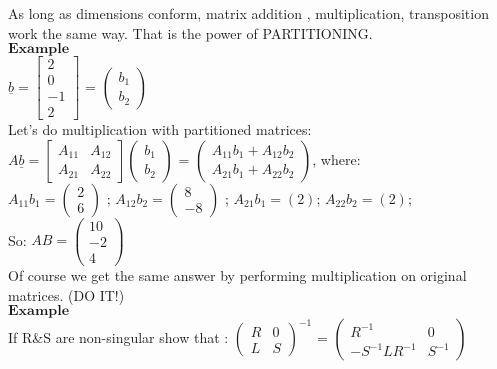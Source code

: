 \documentclass[]{article}
\begin{document}
As long as dimensions conform, matrix addition , multiplication,
transposition work the same way. That is the power of PARTITIONING.\\

\(\mathbf{Example}\)\\

\(\underline{b}=\left[\begin{array}{c|c} 2 \\ 0 \\ \hline -1 \\ 2 \end{array}\right]\)
= \(\begin{pmatrix} b_1 \\ b_2\end{pmatrix}\)\\

Let's do multiplication with partitioned matrices:\\

\(A\underline{b}=\left[\begin{array}{c|c}A_{11} & A_{12} \\ \hline A_{21} & A_{22} \end{array} \right]\begin{pmatrix} b_1 \\ b_2\end{pmatrix}\)
=
\(\begin{pmatrix} A_{11}b_1 + A_{12}b_2\\ A_{21}b_1 + A_{22}b_2\end{pmatrix}\),
where:\\

\(A_{11}b_1=\begin{pmatrix} 2 \\ 6\end{pmatrix}\) ;
\(A_{12}b_2=\begin{pmatrix} 8 \\ -8\end{pmatrix}\) ; \(A_{21}b_1=(2)\);
\(A_{22}b_2=(2)\);\\
 So: \(AB = \begin{pmatrix} 10 \\ -2 \\ 4\end{pmatrix}\)\\
 Of course we get the same answer by performing multiplication on
original matrices. (DO IT!)\\

\(\mathbf{Example}\)\\
 If R\&S are non-singular show that :
\(\begin{pmatrix} R & 0 \\ L & S\end{pmatrix}^{-1}\) =
\(\begin{pmatrix} R^{-1} & 0 \\ -S^{-1}LR^{-1} & S^{-1}\end{pmatrix}\)\\
\end{document}
